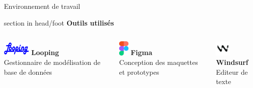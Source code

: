 \documentclass{beamer}
\begin{document}
\begin{frame}[label=environnement]{Environnement de travail}
	\begin{beamercolorbox}[wd=\paperwidth,ht=1.5em,dp=0.5em,leftskip=0.5cm]{section in head/foot}
  		\large \textbf{Outils utilisés}
	\end{beamercolorbox}
	\vspace{0.5em}
	\begin{center}
  		\begin{minipage}{0.9\textwidth}
  			\begin{columns}[T, onlytextwidth]
        				
        				\begin{minipage}[t][2cm][t]{\linewidth}
        					\raggedright
         				\includegraphics[width=1.35cm, height=0.75cm, keepaspectratio]{../img/logo_looping.png} 
         				\hspace{0.1cm} \textbf{Looping} \\ 
         				Gestionnaire de modélisation de base de données
          		  	\end{minipage}
          			\vspace{0.7em}
          			\pause
          			
        				\begin{minipage}[t][2cm][t]{\linewidth}
        					\raggedright
          				\includegraphics[height=0.75cm]{../img/logo_figma.png}
          				\hspace{0.95cm} \textbf{Figma} \\
          				Conception des maquettes et prototypes
          			\end{minipage}
          			\vspace{0.7em}
          			\pause
          		
          			\begin{minipage}[t][2cm][t]{\linewidth}
          				\raggedright
          				\includegraphics[width=0.75cm, height=0.75cm]{../img/logo_windsurf.png}
          				\hspace{0.6cm} \textbf{Windsurf} \\ 
          				Editeur de texte
          			\end{minipage}
          			\pause
          			

\end{columns}
\end{minipage}
\end{center}
\end{frame}
\end{document}
